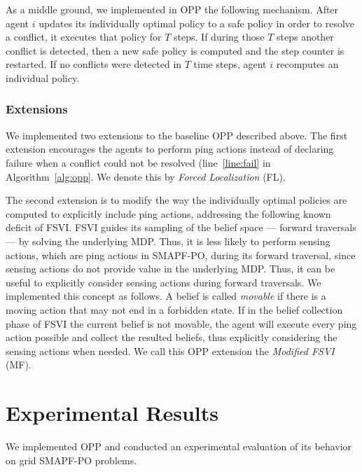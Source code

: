 \documentclass[letterpaper]{article} %
\begin{document}
 As a middle ground, we implemented in OPP the following mechanism. After agent $i$ updates its individually optimal policy to a safe policy in order to resolve a conflict, it executes that policy for $T$ steps. If during those $T$ steps another conflict is detected, then a new safe policy is computed and the step counter is restarted. If no conflicts were detected in $T$ time steps, agent $i$ recomputes an individual  policy.


\subsubsection{Extensions}

We implemented two extensions to the baseline OPP described above. 
The first extension encourages the agents to perform ping actions instead of declaring failure when a conflict could not be resolved (line~\ref{line:fail} in Algorithm~\ref{alg:opp}. We denote this by \emph{Forced Localization} (FL). 


The second extension is to modify the way the individually optimal policies are computed to explicitly include ping actions, addressing the following known deficit of FSVI. 
FSVI guides its sampling of the belief space --- forward traversals --- by solving the underlying MDP. 
Thus, it is less likely to perform sensing actions, which are ping actions in SMAPF-PO, during its forward traversal, since sensing actions do not provide value in the underlying MDP. 
Thus, it can be useful to explicitly consider sensing actions during forward traversals.
We implemented this concept as follows. 
A belief is called \emph{movable} if there is a moving action that may not end in a forbidden state. 
If in the belief collection phase of FSVI the current belief is not movable, the agent will execute every ping action possible and collect the resulted beliefs, thus explicitly considering the sensing actions when needed.
We call this OPP extension the \emph{Modified FSVI} (MF). 




\section{Experimental Results}



We implemented OPP  and conducted an experimental evaluation of its behavior on grid SMAPF-PO problems. 
\end{document}
